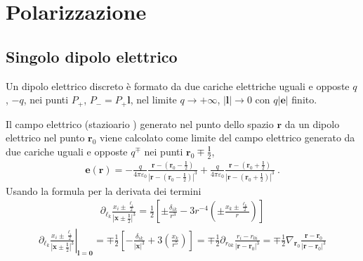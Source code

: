 \documentclass[letterpaper,10pt,italian]{jupyterBook}
\begin{document}
\section{Polarizzazione}
\label{\detokenize{ch/media:polarizzazione}}

\subsection{Singolo dipolo elettrico}
\label{\detokenize{ch/media:singolo-dipolo-elettrico}}
\sphinxAtStartPar
Un dipolo elettrico discreto è formato da due cariche elettriche uguali e opposte \(q\), \(-q\), nei punti \(P_+\), \(P_- = P_+ \mathbf{l}\), nel limite \(q \rightarrow +\infty\), \(|\mathbf{l}| \rightarrow 0\) con \(q |\mathbf{e}|\) finito.

\sphinxAtStartPar
Il campo elettrico (stazioario  ) generato nel punto dello spazio \(\mathbf{r}\) da un dipolo elettrico nel punto \(\mathbf{r}_0\) viene calcolato come limite del campo elettrico generato da due cariche uguali e opposte \(q^{\mp}\) nei punti \(\mathbf{r}_0 \mp \frac{\mathbf{l}}{2}\),
\begin{equation*}
\begin{split}\mathbf{e}(\mathbf{r}) = -\frac{q}{4 \pi \varepsilon_0} \frac{\mathbf{r} - \left( \mathbf{r}_0 - \frac{\mathbf{l}}{2} \right)}{\left|\mathbf{r} - \left( \mathbf{r}_0 - \frac{\mathbf{l}}{2} \right)\right|^3} + \frac{q}{4 \pi \varepsilon_0} \frac{\mathbf{r} - \left( \mathbf{r}_0 + \frac{\mathbf{l}}{2} \right)}{\left|\mathbf{r} - \left( \mathbf{r}_0 + \frac{\mathbf{l}}{2} \right)\right|^3} \ .\end{split}
\end{equation*}
\sphinxAtStartPar
Usando la formula per la derivata dei termini
\begin{equation*}
\begin{split}\partial_{\ell_k} \frac{x_i \pm \frac{\ell_i}{2}}{\left|\mathbf{x} \pm \frac{\mathbf{l}}{2} \right|^3} = \frac{1}{2} \left[ \pm \frac{\delta_{ik}}{r^3} - 3 r^{-4} \left( \pm \frac{x_k \pm \frac{\ell_k}{2}}{r} \right) \right]\end{split}
\end{equation*}\begin{equation*}
\begin{split}\left. \partial_{\ell_k} \frac{x_i \pm \frac{\ell_i}{2}}{\left|\mathbf{x} \pm \frac{\mathbf{l}}{2} \right|^3} \right|_{\mathbf{l} = \mathbf{0}} = \mp \frac{1}{2} \left[ - \frac{\delta_{ik}}{|\mathbf{x}|^3} + 3 \left( \frac{x_k}{r^5} \right) \right] = \mp \frac{1}{2} \partial_{r_{0 k}} \frac{r_i - r_{0 i}}{|\mathbf{r} - \mathbf{r}_0|^3} = \mp \frac{1}{2} \nabla_{\mathbf{r}_0} \frac{\mathbf{r} - \mathbf{r}_0}{|\mathbf{r} - \mathbf{r}_0|^3} \end{split}
\end{equation*}
\end{document}
